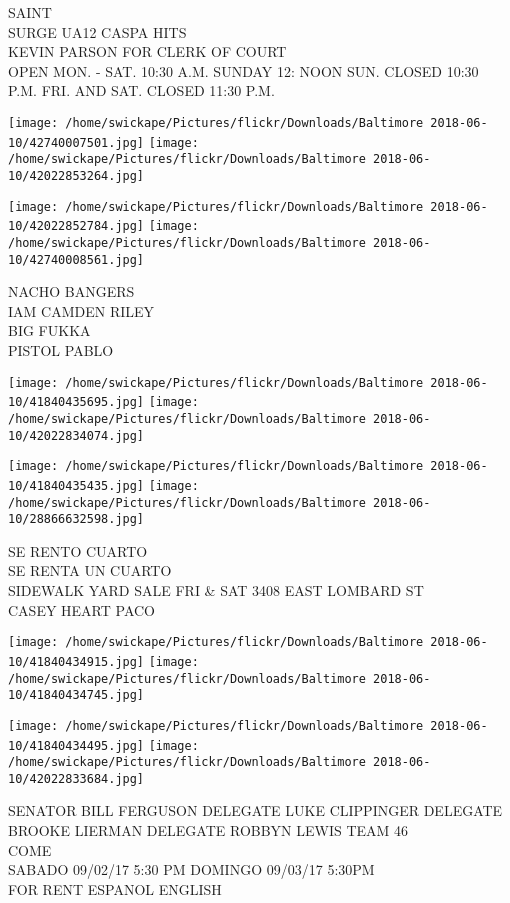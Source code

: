 \documentclass[10pt,letterpaper]{article}
\begin{document}
SAINT\\
SURGE UA12 CASPA HITS\\
KEVIN PARSON FOR CLERK OF COURT\\
OPEN MON. {-} SAT. 10:30 A.M. SUNDAY 12: NOON SUN. CLOSED 10:30 P.M. FRI. AND SAT. CLOSED 11:30 P.M.\\
\pagebreak

\texttt{[image: /home/swickape/Pictures/flickr/Downloads/Baltimore 2018-06-10/42740007501.jpg]}
\texttt{[image: /home/swickape/Pictures/flickr/Downloads/Baltimore 2018-06-10/42022853264.jpg]}

\texttt{[image: /home/swickape/Pictures/flickr/Downloads/Baltimore 2018-06-10/42022852784.jpg]}
\texttt{[image: /home/swickape/Pictures/flickr/Downloads/Baltimore 2018-06-10/42740008561.jpg]}

NACHO BANGERS\\
IAM CAMDEN RILEY\\
BIG FUKKA\\
PISTOL PABLO\\
\pagebreak

\texttt{[image: /home/swickape/Pictures/flickr/Downloads/Baltimore 2018-06-10/41840435695.jpg]}
\texttt{[image: /home/swickape/Pictures/flickr/Downloads/Baltimore 2018-06-10/42022834074.jpg]}

\texttt{[image: /home/swickape/Pictures/flickr/Downloads/Baltimore 2018-06-10/41840435435.jpg]}
\texttt{[image: /home/swickape/Pictures/flickr/Downloads/Baltimore 2018-06-10/28866632598.jpg]}

SE RENTO CUARTO\\
SE RENTA UN CUARTO\\
SIDEWALK YARD SALE FRI \& SAT 3408 EAST LOMBARD ST\\
CASEY HEART PACO\\
\pagebreak

\texttt{[image: /home/swickape/Pictures/flickr/Downloads/Baltimore 2018-06-10/41840434915.jpg]}
\texttt{[image: /home/swickape/Pictures/flickr/Downloads/Baltimore 2018-06-10/41840434745.jpg]}

\texttt{[image: /home/swickape/Pictures/flickr/Downloads/Baltimore 2018-06-10/41840434495.jpg]}
\texttt{[image: /home/swickape/Pictures/flickr/Downloads/Baltimore 2018-06-10/42022833684.jpg]}

SENATOR BILL FERGUSON DELEGATE LUKE CLIPPINGER DELEGATE BROOKE LIERMAN DELEGATE ROBBYN LEWIS TEAM 46\\
COME\\
SABADO 09/02/17 5:30 PM DOMINGO 09/03/17 5:30PM\\
FOR RENT ESPANOL ENGLISH\\
\pagebreak
\end{document}
